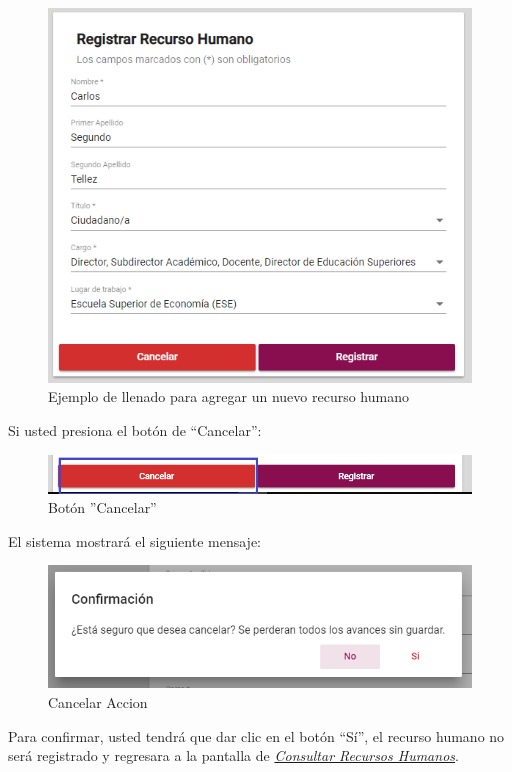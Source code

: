             \begin{figure}[H]
                \centering
                \hypertarget{ejreg}{\includegraphics[width=0.7\linewidth]{images/SP1/RegistrarLleno}}
                \caption{Ejemplo de llenado para agregar un nuevo recurso humano}
                \label{ejreg}
            \end{figure}

    \newpage
            Si usted presiona el botón de “Cancelar”:

            \begin{figure}[H]
                \centering
                \hypertarget{cancel1}{\includegraphics[width=0.7\linewidth]{images/SP1/BtnCancelar1}}
                \caption{Botón ''Cancelar''}
                \label{cancel1}
            \end{figure}

            El sistema mostrará el siguiente mensaje:


             \begin{figure}[H]
                \centering
            \includegraphics[width=0.4\linewidth]{images/SP1/MSG29}
                \caption{Cancelar Accion}
                \label{mensaje29}
            \end{figure}

            Para confirmar, usted tendrá que dar clic en el botón “Sí”, el recurso humano no será registrado y regresara a la pantalla de \hyperlink{consultarRH}{\textit{Consultar Recursos Humanos}}.

